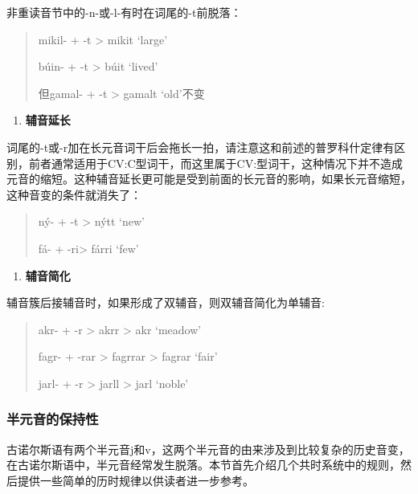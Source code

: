 非重读音节中的-n-或-l-有时在词尾的-t前脱落：

\begin{quote}
mikil- + -t \textgreater{} mikit `large'

búin- + -t \textgreater{} búit `lived'

但gamal- + -t \textgreater{} gamalt `old'不变
\end{quote}

\begin{enumerate}
\def\labelenumi{\Alph{enumi}.}
\setcounter{enumi}{3}
\item
  \label{_Ref116211616}{}\textbf{辅音延长}
\end{enumerate}

词尾的-t或-r加在长元音词干后会拖长一拍，请注意这和前述的普罗科什定律有区别，前者通常适用于CV:C型词干，而这里属于CV:型词干，这种情况下并不造成元音的缩短。这种辅音延长更可能是受到前面的长元音的影响，如果长元音缩短，这种音变的条件就消失了：

\begin{quote}
ný- + -t \textgreater{} nýtt `new'

fá- + -ri\textgreater{} fárri `few'
\end{quote}

\begin{enumerate}
\def\labelenumi{\Alph{enumi}.}
\setcounter{enumi}{4}
\item
  \label{_Ref115765758}{}\textbf{辅音简化}
\end{enumerate}

辅音簇后接辅音时，如果形成了双辅音，则双辅音简化为单辅音:

\begin{quote}
akr- + -r \textgreater{} akrr \textgreater{} akr `meadow'

fagr- + -rar \textgreater{} fagrrar \textgreater{} fagrar `fair'

jarl- + -r \textgreater{} jarll \textgreater{} jarl `noble'
\end{quote}

\subsubsection{半元音的保持性}\label{ux534aux5143ux97f3ux7684ux4fddux6301ux6027}

古诺尔斯语有两个半元音j和v，这两个半元音的由来涉及到比较复杂的历史音变，在古诺尔斯语中，半元音经常发生脱落。本节首先介绍几个共时系统中的规则，然后提供一些简单的历时规律以供读者进一步参考。

